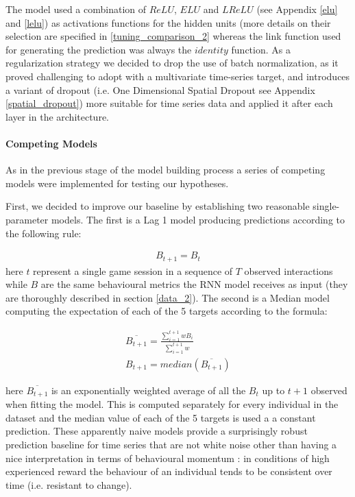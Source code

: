 The model used a combination of $ReLU$, $ELU$ and $LReLU$ (see Appendix \ref{elu} and \ref{lelu}) as activations functions for the hidden units (more details on their selection are specified in \ref{tuning_comparison_2} whereas the link function used for generating the prediction was always the $identity$ function. As a regularization strategy we decided to drop the use of batch normalization, as it proved challenging to adopt with a multivariate time-series target, and introduces a variant of dropout (i.e. One Dimensional Spatial Dropout see Appendix \ref{spatial_dropout}) more suitable for time series data and applied it after each layer in the architecture.

\paragraph{Competing Models}
\label{competing_models_2}
As in the previous stage of the model building process a series of competing models were implemented for testing our hypotheses. 

First, we decided to improve our baseline by establishing two reasonable single-parameter models. The first is a Lag 1 model producing predictions according to the following rule:

\begin{equation}
   \begin{gathered}  
     B_{t+1} = B_{t}
     \label{lag_1}
  \end{gathered}
\end{equation}
here $t$ represent a single game session in a sequence of $T$ observed interactions while $B$ are the same behavioural metrics the RNN model receives as input (they are thoroughly described in section \ref{data_2}). The second is a Median model computing the expectation of each of the 5 targets according to the formula:

\begin{equation}
  \begin{gathered}  
    \overline{B_{t+1}} = \frac
      {\sum_{i=1}^{t+1} wB_{i}}
      {\sum_{i=1}^{t+1} w }\\
    B_{t+1} = median(\overline{B_{t+1}}) 
    \label{median}
  \end{gathered}
\end{equation}

here $\overline{B_{t+1}}$ is an exponentially weighted average of all the $B_t$ up to $t+1$ observed when fitting the model. This is computed separately for every individual in the dataset and the median value of each of the 5 targets is used a a constant prediction. These apparently naive models provide a surprisingly robust prediction baseline for time series that are not white noise \cite{hyndman2018forecasting} other than having a nice interpretation in terms of behavioural momentum \cite{nevin2000behavioral}: in conditions of high experienced reward the behaviour of an individual tends to be consistent over time (i.e. resistant to change). 

